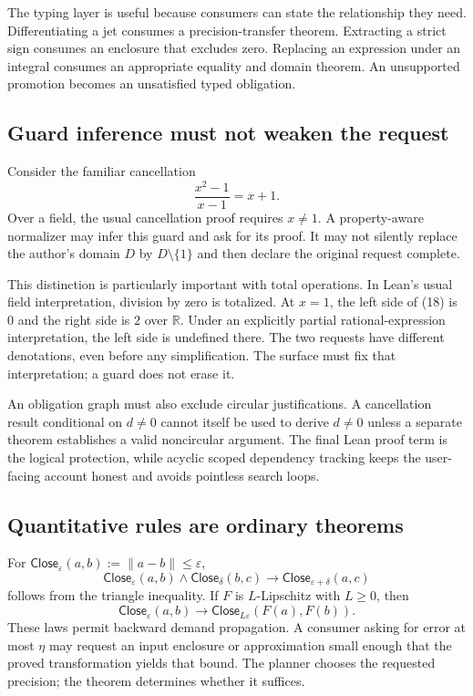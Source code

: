 \documentclass[11pt,letterpaper]{article}
\newcommand{\R}{\mathbb R}
\theoremstyle{definition}
\theoremstyle{remark}
\begin{document}
The typing layer is useful because consumers can state the relationship they
need. Differentiating a jet consumes a precision-transfer theorem. Extracting a
strict sign consumes an enclosure that excludes zero. Replacing an expression
under an integral consumes an appropriate equality and domain theorem. An
unsupported promotion becomes an unsatisfied typed obligation.

\subsection{Guard inference must not weaken the request}
Consider the familiar cancellation
\[
\frac{x^2-1}{x-1}=x+1.
\tag{18}
\]
Over a field, the usual cancellation proof requires $x\ne1$. A property-aware
normalizer may infer this guard and ask for its proof. It may not silently
replace the author's domain $D$ by $D\setminus\{1\}$ and then declare the
original request complete.

This distinction is particularly important with total operations. In Lean's
usual field interpretation, division by zero is totalized. At $x=1$, the left
side of (18) is $0$ and the right side is $2$ over $\R$. Under an explicitly
partial rational-expression interpretation, the left side is undefined there.
The two requests have different denotations, even before any simplification.
The surface must fix that interpretation; a guard does not erase it.

An obligation graph must also exclude circular justifications. A cancellation
result conditional on $d\ne0$ cannot itself be used to derive $d\ne0$ unless a
separate theorem establishes a valid noncircular argument. The final Lean proof
term is the logical protection, while acyclic scoped dependency tracking keeps
the user-facing account honest and avoids pointless search loops.

\subsection{Quantitative rules are ordinary theorems}
For $\mathsf{Close}_\varepsilon(a,b):=\|a-b\|\le\varepsilon$,
\[
\mathsf{Close}_\varepsilon(a,b)\land
\mathsf{Close}_\delta(b,c)
\longrightarrow\mathsf{Close}_{\varepsilon+\delta}(a,c)
\tag{19}
\]
follows from the triangle inequality. If $F$ is $L$-Lipschitz with $L\ge0$, then
\[
\mathsf{Close}_\varepsilon(a,b)
\longrightarrow\mathsf{Close}_{L\varepsilon}(F(a),F(b)).
\tag{20}
\]
These laws permit backward demand propagation. A consumer asking for error at
most $\eta$ may request an input enclosure or approximation small enough that the
proved transformation yields that bound. The planner chooses the requested
precision; the theorem determines whether it suffices.
\end{document}
